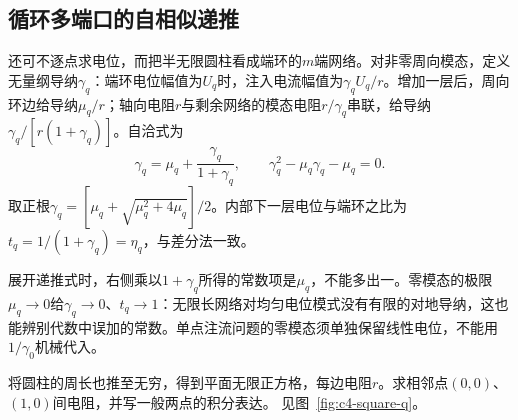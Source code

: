 \subsection{循环多端口的自相似递推}\label{sec:c4-cyclic-star}
还可不逐点求电位，而把半无限圆柱看成端环的$m$端网络。对非零周向模态，定义无量纲导纳$\gamma_q$：端环电位幅值为$U_q$时，注入电流幅值为$\gamma_qU_q/r$。增加一层后，周向环边给导纳$\mu_q/r$；轴向电阻$r$与剩余网络的模态电阻$r/\gamma_q$串联，给导纳$\gamma_q/[r(1+\gamma_q)]$。自洽式为
\[
 \gamma_q=\mu_q+\frac{\gamma_q}{1+\gamma_q},
 \qquad
 \boxed{\gamma_q^2-\mu_q\gamma_q-\mu_q=0}.
\]
取正根$\gamma_q=[\mu_q+\sqrt{\mu_q^2+4\mu_q}]/2$。内部下一层电位与端环之比为
$t_q=1/(1+\gamma_q)=\eta_q$，与差分法一致。

展开递推式时，右侧乘以$1+\gamma_q$所得的常数项是$\mu_q$，不能多出一。零模态的极限$\mu_q\to0$给$\gamma_q\to0$、$t_q\to1$：无限长网络对均匀电位模式没有有限的对地导纳，这也能辨别代数中误加的常数。单点注流问题的零模态须单独保留线性电位，不能用$1/\gamma_0$机械代入。

\begin{example}[无限方格相邻点的电阻]\label{ex:c4-square}
将圆柱的周长也推至无穷，得到平面无限正方格，每边电阻$r$。求相邻点$(0,0)$、$(1,0)$间电阻，并写一般两点的积分表达。 见图~\ref{fig:c4-square-q}。
\end{example}

